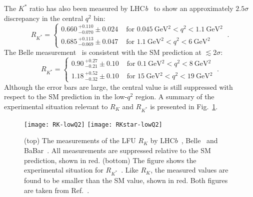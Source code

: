 The $K^{*}$ ratio has also been measured by LHC\textit{b}~\cite{Aaij:2017vbb} to
show an approximately $2.5 \sigma$ discrepancy in the central $q^{2}$ bin:
\begin{equation}
  \label{eq:ch1-RKstar-lhcb}
  R_{K^*} = \begin{cases}
    0.660\,_{-0.070}^{+0.110}\pm 0.024 & \text{ for $\SI{0.045}{\GeV^{2}} < q^2 < \SI{1.1}{\GeV^{2}}$} \\
    0.685\,_{-0.069}^{+0.113}\pm 0.047 & \text{ for $\SI{1.1}{\GeV^{2}} < q^2 < \SI{6}{\GeV^{2}}$}
  \end{cases} \ .
\end{equation}
The Belle measurement~\cite{Abdesselam:2019wac} is consistent with the SM
prediction at $\lesssim 2\sigma$:
\begin{equation}
  \label{eq:ch1-RKstar-belle}
  R_{K^*} = \begin{cases}
    0.90\,_{-0.21}^{+0.27} \pm 0.10 & \text{ for $\SI{0.1}{\GeV^{2}} < q^2 < \SI{8}{\GeV^{2}}$} \\
    1.18\,_{-0.32}^{+0.52} \pm 0.10 & \text{ for $\SI{15}{\GeV^{2}} < q^2 < \SI{19}{\GeV^{2}}$}
  \end{cases} \ .
\end{equation}
Although the error bars are large, the central value is still suppressed with
respect to the SM prediction in the low-$q^{2}$ region. A summary of the
experimental situation relevant to $R_{K}$ and $R_{K^{*}}$ is presented in
Fig.~\ref{fig:ch1-rkrkstar-summary}.

\begin{figure}
  \centering
  \texttt{[image: RK-lowQ2]}
  \texttt{[image: RKstar-lowQ2]}
  \caption[(top) The measurements of the LFU $R_{K}$ by
  LHC$b$~\cite{Aaij:2019wad}, Belle~\cite{Abdesselam:2019lab} and
  BaBar~\cite{Lees:2012tva}. (bottom) The figure shows the experimental
  situation for $R_{K^{*}}$~\cite{Lees:2012tva, Abdesselam:2019wac,
    Aaij:2017vbb}.]{(top) The measurements of the LFU $R_{K}$ by
    LHC$b$~\cite{Aaij:2019wad}, Belle~\cite{Abdesselam:2019lab} and
    BaBar~\cite{Lees:2012tva}. All measurements are suppressed relative to the
    SM prediction, shown in red. (bottom) The figure shows the experimental
    situation for $R_{K^{*}}$~\cite{Lees:2012tva, Abdesselam:2019wac,
      Aaij:2017vbb}. Like $R_{K}$, the measured values are found to be smaller
    than the SM value, shown in red. Both figures are taken from
    Ref.~\cite{Koppenburg:2016rji}.}
  \label{fig:ch1-rkrkstar-summary}
\end{figure}

